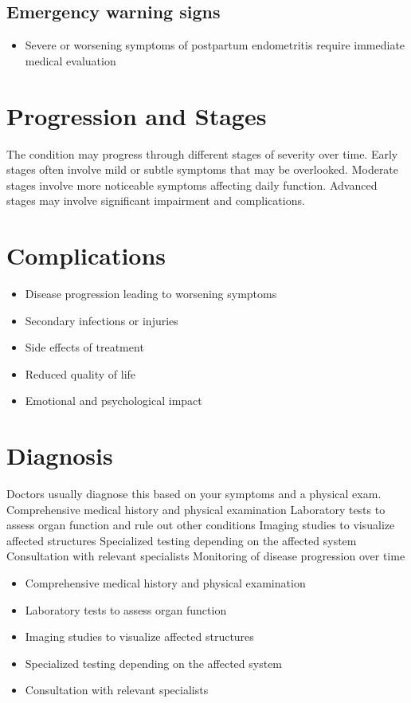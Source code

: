 \subsection{Emergency warning signs}
\begin{itemize}[noitemsep]
  \item Severe or worsening symptoms of postpartum endometritis require immediate medical evaluation
\end{itemize}
\section{Progression and Stages}
The condition may progress through different stages of severity over time. Early stages often involve mild or subtle symptoms that may be overlooked. Moderate stages involve more noticeable symptoms affecting daily function. Advanced stages may involve significant impairment and complications.
\section{Complications}
\begin{itemize}[noitemsep]
  \item Disease progression leading to worsening symptoms
  \item Secondary infections or injuries
  \item Side effects of treatment
  \item Reduced quality of life
  \item Emotional and psychological impact
\end{itemize}
\section{Diagnosis}
Doctors usually diagnose this based on your symptoms and a physical exam. Comprehensive medical history and physical examination Laboratory tests to assess organ function and rule out other conditions Imaging studies to visualize affected structures Specialized testing depending on the affected system Consultation with relevant specialists Monitoring of disease progression over time

\begin{itemize}[noitemsep]
  \item Comprehensive medical history and physical examination
  \item Laboratory tests to assess organ function
  \item Imaging studies to visualize affected structures
  \item Specialized testing depending on the affected system
  \item Consultation with relevant specialists
\end{itemize}
